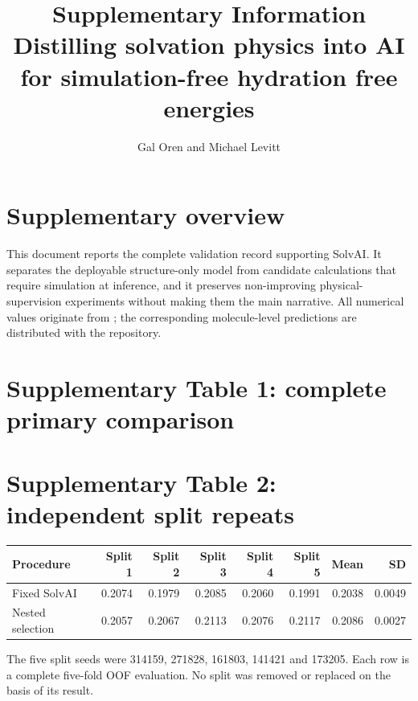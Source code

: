 \documentclass[10pt]{article}
\title{Supplementary Information\\[4pt]\large Distilling solvation physics into AI for simulation-free hydration free energies}
\author{Gal Oren and Michael Levitt}
\date{}
\begin{document}
\linenumbers
\maketitle

\section*{Supplementary overview}

This document reports the complete validation record supporting SolvAI. It separates the deployable structure-only model from candidate calculations that require simulation at inference, and it preserves non-improving physical-supervision experiments without making them the main narrative. All numerical values originate from ; the corresponding molecule-level predictions are distributed with the repository.

\section*{Supplementary Table 1: complete primary comparison}

\begin{table}[h]
\centering
\small

\caption{MAE in kcal mol$^{-1}$. A dash denotes a comparison that was not defined for that fixed artifact. Only rows marked ``no'' satisfy the deployment requirement.}
\end{table}

\section*{Supplementary Table 2: independent split repeats}

\begin{center}
\begin{tabular}{lrrrrrrr}
\toprule
Procedure & Split 1 & Split 2 & Split 3 & Split 4 & Split 5 & Mean & SD \\
\midrule
Fixed SolvAI & 0.2074 & 0.1979 & 0.2085 & 0.2060 & 0.1991 & 0.2038 & 0.0049 \\
Nested selection & 0.2057 & 0.2067 & 0.2113 & 0.2076 & 0.2117 & 0.2086 & 0.0027 \\
\bottomrule
\end{tabular}
\end{center}

The five split seeds were 314159, 271828, 161803, 141421 and 173205. Each row is a complete five-fold OOF evaluation. No split was removed or replaced on the basis of its result.
\end{document}
